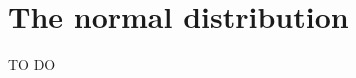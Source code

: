 \documentclass[../../../main.tex]{subfiles}
\begin{document}
\chapter{The normal distribution}

TO DO
\end{document}
